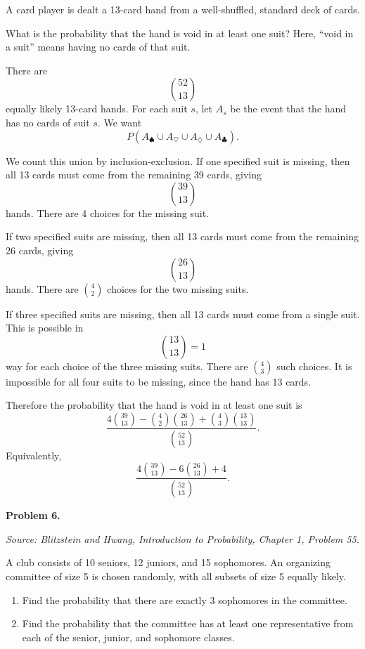 \documentclass[11pt]{article}
\newcommand{\source}[1]{%
    \vspace{0.15cm}
    {\small\textit{Source: Blitzstein and Hwang, \textit{Introduction to Probability}, Chapter 1, Problem #1.}}
}
\begin{document}
A card player is dealt a 13-card hand from a well-shuffled, standard deck of cards.

What is the probability that the hand is void in at least one suit? Here, ``void in a suit'' means having no cards of that suit.

\begin{solutionbox}
There are
\[
\binom{52}{13}
\]
equally likely 13-card hands. For each suit \(s\), let \(A_s\) be the event that the hand has no cards of suit \(s\). We want
\[
P(A_{\spadesuit}\cup A_{\heartsuit}\cup A_{\diamondsuit}\cup A_{\clubsuit}).
\]

We count this union by inclusion-exclusion. If one specified suit is missing, then all 13 cards must come from the remaining 39 cards, giving
\[
\binom{39}{13}
\]
hands. There are 4 choices for the missing suit.

If two specified suits are missing, then all 13 cards must come from the remaining 26 cards, giving
\[
\binom{26}{13}
\]
hands. There are \(\binom{4}{2}\) choices for the two missing suits.

If three specified suits are missing, then all 13 cards must come from a single suit. This is possible in
\[
\binom{13}{13}=1
\]
way for each choice of the three missing suits. There are \(\binom{4}{3}\) such choices. It is impossible for all four suits to be missing, since the hand has 13 cards.

Therefore the probability that the hand is void in at least one suit is
\[
\frac{
4\binom{39}{13}
-
\binom{4}{2}\binom{26}{13}
+
\binom{4}{3}\binom{13}{13}
}{
\binom{52}{13}
}.
\]
Equivalently,
\[
\frac{
4\binom{39}{13}
-
6\binom{26}{13}
+
4
}{
\binom{52}{13}
}.
\]

\end{solutionbox}
\newpage


\begin{problemheader}
\textbf{Problem 6. }
\end{problemheader}
\source{55}

A club consists of 10 seniors, 12 juniors, and 15 sophomores. An organizing committee of size 5 is chosen randomly, with all subsets of size 5 equally likely.

\begin{enumerate}[label=(\alph*), leftmargin=*]
    \item Find the probability that there are exactly 3 sophomores in the committee.

    \item Find the probability that the committee has at least one representative from each of the senior, junior, and sophomore classes.
\end{enumerate}
\end{document}
